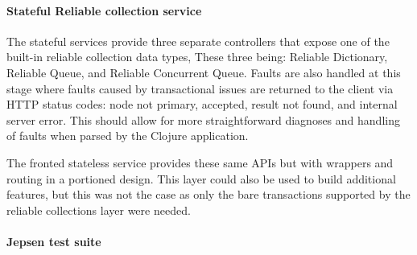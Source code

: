 \documentclass[a4paper,10pt,titlepage]{report}
\begin{document}
    \paragraph*{Stateful Reliable collection service}

    The stateful services provide three separate controllers that expose one of the built-in reliable collection data types, These three being: Reliable Dictionary, Reliable Queue, and Reliable Concurrent Queue. Faults are also handled at this stage where faults caused by transactional issues are returned to the client via HTTP status codes\cite{wikihttpstatuscodes}: node not primary, accepted, result not found, and internal server error. This should allow for more straightforward diagnoses and handling of faults when parsed by the Clojure application.

    The fronted stateless service provides these same APIs but with wrappers and routing in a portioned design. This layer could also be used to build additional features, but this was not the case as only the bare transactions supported by the reliable collections layer were needed.

    \paragraph*{Jepsen test suite}
    
\end{document}
